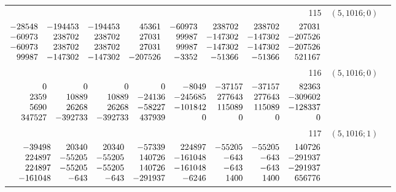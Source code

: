 \documentclass[11pt]{article}
\theoremstyle{remark}
\numberwithin{equation}{section}
\begin{document}
\begin{longtable}{rcl}
115 & $(5,1016;0)$ & \begin{tabular}[t]{@{}l@{}}$w_i=\displaystyle \frac{1334751114552388891}{11285211164350150200000000000000000000}$\\[3pt]{\scriptsize$\begin{array}{@{}rrrrrrrr@{}}-28548 & -194453 & -194453 & 45361 & -60973 & 238702 & 238702 & 27031\\-60973 & 238702 & 238702 & 27031 & 99987 & -147302 & -147302 & -207526\\-60973 & 238702 & 238702 & 27031 & 99987 & -147302 & -147302 & -207526\\99987 & -147302 & -147302 & -207526 & -3352 & -51366 & -51366 & 521167\end{array}$}\end{tabular}\\[8pt]
116 & $(5,1016;0)$ & \begin{tabular}[t]{@{}l@{}}$w_i=\displaystyle \frac{205465028551129}{893542963568225000000000000000000}$\\[3pt]{\scriptsize$\begin{array}{@{}rrrrrrrr@{}}0 & 0 & 0 & 0 & -8049 & -37157 & -37157 & 82363\\2359 & 10889 & 10889 & -24136 & -245685 & 277643 & 277643 & -309602\\5690 & 26268 & 26268 & -58227 & -101842 & 115089 & 115089 & -128337\\347527 & -392733 & -392733 & 437939 & 0 & 0 & 0 & 0\end{array}$}\end{tabular}\\[8pt]
117 & $(5,1016;1)$ & \begin{tabular}[t]{@{}l@{}}$w_i=\displaystyle \frac{2374238923720170331}{5377960579829607024000000000000000000}$\\[3pt]{\scriptsize$\begin{array}{@{}rrrrrrrr@{}}-39498 & 20340 & 20340 & -57339 & 224897 & -55205 & -55205 & 140726\\224897 & -55205 & -55205 & 140726 & -161048 & -643 & -643 & -291937\\224897 & -55205 & -55205 & 140726 & -161048 & -643 & -643 & -291937\\-161048 & -643 & -643 & -291937 & -6246 & 1400 & 1400 & 656776\end{array}$}\end{tabular}\\[8pt]

\end{longtable}
\end{document}
